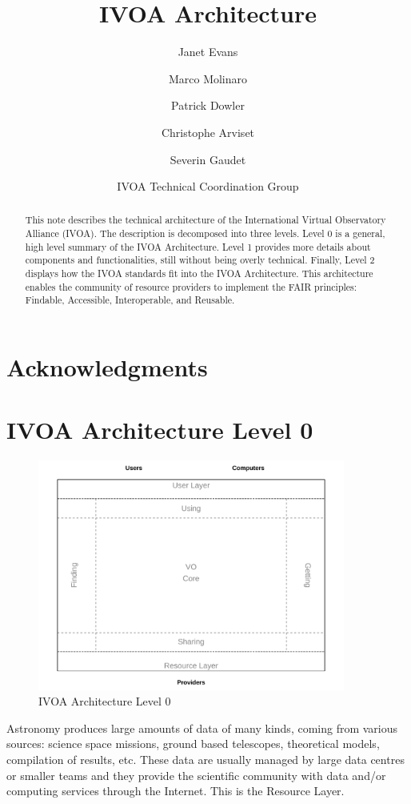 \documentclass[11pt,letter]{ivoa}
\title{IVOA Architecture}
\author{Janet Evans}
\author{Marco Molinaro}
\author{Patrick Dowler}
\author{Christophe Arviset}
\author{Severin Gaudet}
\author{IVOA Technical Coordination Group}
\begin{document}
\begin{abstract}
This note describes the technical architecture of the International Virtual Observatory Alliance 
(IVOA). The description is decomposed 
into three levels. Level 0 is a general, high level summary of the IVOA Architecture. 
Level 1 provides more details about components and functionalities, still without 
being overly technical. Finally, Level 2 displays how the IVOA standards fit into 
the IVOA Architecture. This architecture enables the community of resource providers to
implement the FAIR principles: Findable, Accessible, Interoperable, and Reusable.
\end{abstract}

\section*{Acknowledgments}

\section{IVOA Architecture Level 0}

\begin{figure}[h]
\centering
\includegraphics[width=0.9\textwidth]{archdiag0.pdf}
\caption{IVOA Architecture Level 0}
\label{fig:architecture0}
\end{figure}

Astronomy produces large amounts of data of many kinds, coming from various sources: 
science  space missions, ground based telescopes, theoretical models, compilation of 
results, etc.  These data are usually managed by large data centres or smaller teams
and they provide  the scientific community with data and/or computing services 
through the Internet. This is the Resource Layer. 
\end{document}
